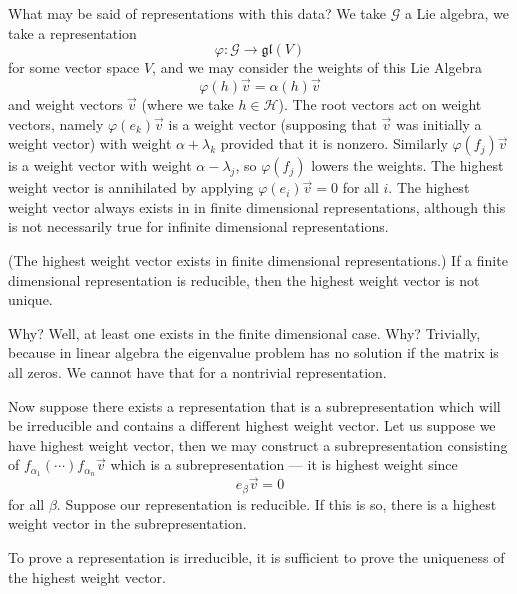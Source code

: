 What may be said of representations with this data? We take
$\mathscr{G}$ a Lie algebra, we take a representation
\begin{equation}
\varphi\colon\mathscr{G}\to\mathfrak{gl}(V)
\end{equation}
for some vector space $V$, and we may consider the weights of
this Lie Algebra
\begin{equation}
\varphi(h)\vec{v}=\alpha(h)\vec{v}
\end{equation}
and weight vectors $\vec{v}$ (where we take
$h\in\mathscr{H}$). The root vectors act on weight vectors,
namely $\varphi(e_{k})\vec{v}$ is a weight vector (supposing that
$\vec{v}$ was initially a weight vector) with weight
$\alpha+\lambda_{k}$ provided that it is nonzero. Similarly
$\varphi(f_{j})\vec{v}$ is a weight vector with weight
$\alpha-\lambda_{j}$, so $\varphi(f_{j})$ lowers the weights. The
highest weight vector is annihilated by applying
$\varphi(e_{i})\vec{v}=0$ for all $i$. The highest weight vector
always exists in in finite dimensional representations, although
this is not necessarily true for infinite dimensional
representations. 

\begin{thm} {\rm(The highest weight vector exists in finite
    dimensional representations.)} If a finite dimensional
  representation is reducible, then the highest weight vector is
  not unique.
\end{thm}

Why? Well, at least one exists in the finite dimensional
case. Why? Trivially, because in linear algebra the eigenvalue
problem has no solution if the matrix is all zeros. We cannot
have that for a nontrivial representation. 

Now suppose there exists a representation that is a
subrepresentation which will be irreducible and contains a
different highest weight vector. Let us suppose we have highest
weight vector, then we may construct a subrepresentation
consisting of
$f_{\alpha_{1}}(\cdots{})f_{\alpha_{n}}\vec{v}$ which
is a subrepresentation --- it is highest weight since
\begin{equation}
e_{\beta}\vec{v}=0
\end{equation}
for all $\beta$. Suppose our representation is reducible. If this
is so, there is a highest weight vector in the subrepresentation.

\begin{rmk}
To prove a representation is irreducible, it is sufficient to
prove the uniqueness of the highest weight vector.
\end{rmk}

